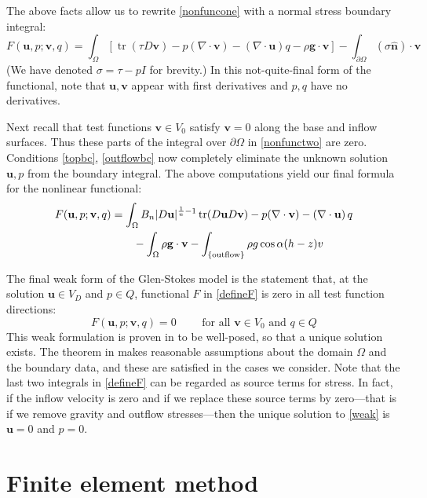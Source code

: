 \documentclass[letterpaper,final,12pt,reqno]{amsart}
\newcommand{\trace}{\operatorname{tr}}
\newcommand{\hbn}{\hat{\mathbf{n}}}
\newcommand{\bu}{\mathbf{u}}
\newcommand{\bv}{\mathbf{v}}
\begin{document}
The above facts allow us to rewrite \eqref{nonfuncone} with a normal stress boundary integral:
\begin{equation}
F(\bu,p;\bv,q) =  \int_\Omega \left[\trace(\tau D\bv) - p (\nabla \cdot \bv) - \left(\nabla \cdot \bu\right) q - \rho \mathbf{g} \cdot \bv\right] - \int_{\partial\Omega} (\sigma \hbn)\cdot \bv \label{nonfunctwo}
\end{equation}
(We have denoted $\sigma=\tau-pI$ for brevity.)  In this not-quite-final form of the functional, note that $\bu,\bv$ appear with first derivatives and $p,q$ have no derivatives.

Next recall that test functions $\bv\in V_0$ satisfy $\bv=0$ along the base and inflow surfaces.  Thus these parts of the integral over $\partial\Omega$ in \eqref{nonfunctwo} are zero.  Conditions \eqref{topbc}, \eqref{outflowbc} now completely eliminate the unknown solution $\bu,p$ from the boundary integral.  The above computations yield our final formula for the nonlinear functional:
\begin{align}
F(\bu,p;\bv,q) &= \int_\Omega B_n |D\bu|^{\frac{1}{n} - 1} \trace(D\bu D\bv) - p (\nabla \cdot \bv) - \left(\nabla \cdot \bu\right) q \label{defineF} \\
    &\qquad  - \int_\Omega \rho \mathbf{g} \cdot \bv - \int_{\{\text{outflow}\}} \rho g \cos\alpha (h-z) v  \notag
\end{align}

The final weak form of the Glen-Stokes model is the statement that, at the solution $\bu\in V_D$ and $p\in Q$, functional $F$ in \eqref{defineF} is zero in all test function directions:
\begin{equation}
F(\bu,p;\bv,q) = 0 \qquad \text{ for all } \bv\in V_0 \text{ and } q\in Q  \label{weak}
\end{equation}
This weak formulation is proven in \cite[Theorem 3.8]{JouvetRappaz2011} to be well-posed, so that a unique solution exists.  The theorem in \cite{JouvetRappaz2011} makes reasonable assumptions about the domain $\Omega$ and the boundary data, and these are satisfied in the cases we consider.  Note that the last two integrals in \eqref{defineF} can be regarded as source terms for stress.  In fact, if the inflow velocity is zero and if we replace these source terms by zero---that is if we remove gravity and outflow stresses---then the unique solution to \eqref{weak} is $\bu=0$ and $p=0$.


\section{Finite element method} \label{sec:femethod}
\end{document}
